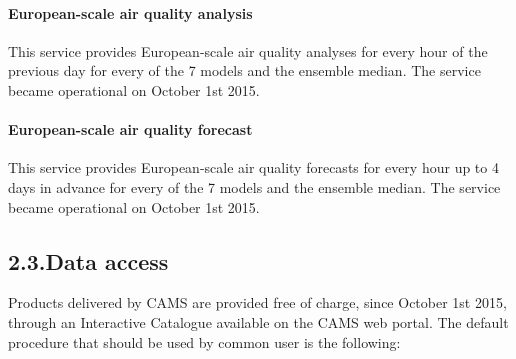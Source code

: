 \documentclass[9pt]{report}
\begin{document}
\paragraph{European-scale air quality analysis}\label{sec-european-scale-air-quality-analysis}%

\noindent{}This service provides European-scale air quality analyses for every hour of the previous day for every of the 7 models and the ensemble median. 
The service became operational on October 1st 2015.%

\paragraph{European-scale air quality forecast}\label{sec-european-scale-air-quality-forecast}%

\noindent{}\mdbr
{}This service provides European-scale air quality forecasts for every hour up to 4 days in advance for every of the 7 models and the ensemble median. 
The service became operational on October 1st 2015.%

\subsection{2.3.\hspace*{0.5em}Data access}\label{sec-data-access}%

\noindent{}Products delivered by CAMS are provided free of charge, since October 1st 2015, through an Interactive Catalogue available on the CAMS web portal. 
The default procedure that should be used by common user is the following:%
\end{document}
